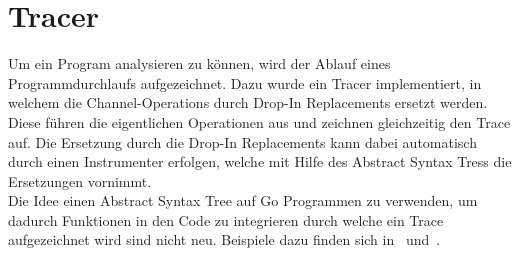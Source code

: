 \chapter{Tracer}
Um ein Program analysieren zu können, wird der Ablauf eines Programmdurchlaufs
aufgezeichnet. Dazu wurde ein Tracer implementiert, in welchem die 
Channel-Operations durch Drop-In Replacements ersetzt werden. Diese 
führen die eigentlichen Operationen aus und zeichnen gleichzeitig den 
Trace auf. Die Ersetzung durch die Drop-In Replacements kann dabei automatisch 
durch einen Instrumenter erfolgen, welche mit Hilfe des Abstract Syntax Tress 
die Ersetzungen vornimmt.\\
Die Idee einen Abstract Syntax Tree 
auf Go Programmen zu verwenden, um dadurch Funktionen in den Code zu 
integrieren durch welche ein Trace aufgezeichnet wird sind nicht neu. Beispiele 
dazu finden sich in~\cite{GoAt1} und~\cite{GoVis}.  


